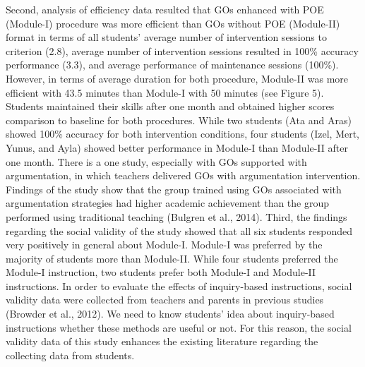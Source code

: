 \documentclass[11.5pt]{sig-alternate} %
\begin{document}
\begin{large}
Second, analysis of efficiency data resulted that GOs enhanced with POE (Module-I) procedure was more efficient than GOs without POE (Module-II) format in terms of all students’ average number of intervention sessions to criterion (2.8), average number of intervention sessions resulted in 100\% accuracy performance (3.3), and average performance of maintenance sessions (100\%). However, in terms of average duration for both procedure, Module-II was more efficient with 43.5 minutes than Module-I with 50 minutes (see Figure 5). Students maintained their skills after one month and obtained higher scores comparison to baseline for both procedures. While two students (Ata and Aras) showed 100\% accuracy for both intervention conditions, four students (Izel, Mert, Yunus, and Ayla) showed better performance in Module-I than Module-II after one month. There is a one study, especially with GOs supported with argumentation, in which teachers delivered GOs with argumentation intervention. Findings of the study show that the group trained using GOs associated with argumentation strategies had higher academic achievement than the group performed using traditional teaching (Bulgren et al., 2014). 
Third, the findings regarding the social validity of the study showed that all six students responded very positively in general about Module-I. Module-I was preferred by the majority of students more than Module-II. While four students preferred the Module-I instruction, two students prefer both Module-I and Module-II instructions. In order to evaluate the effects of inquiry-based instructions, social validity data were collected from teachers and parents in previous studies (Browder et al., 2012). We need to know students’ idea about inquiry-based instructions whether these methods are useful or not. For this reason, the social validity data of this study enhances the existing literature regarding the collecting data from students.


\end{large}
\end{document}
